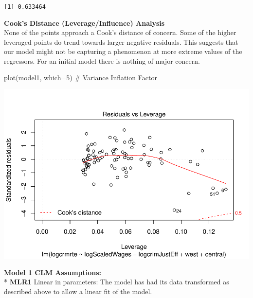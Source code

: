 \documentclass[]{article}
\newenvironment{Shaded}{}{}
\newcommand{\CommentTok}[1]{\textcolor[rgb]{0.00,0.50,0.00}{#1}}
\newcommand{\DataTypeTok}[1]{#1}
\newcommand{\DecValTok}[1]{#1}
\newcommand{\KeywordTok}[1]{\textcolor[rgb]{0.00,0.00,1.00}{#1}}
\newcommand{\NormalTok}[1]{#1}
\newcommand{\OperatorTok}[1]{#1}
\begin{document}
\begin{Shaded}
\end{Shaded}

\begin{verbatim}
[1] 0.633464
\end{verbatim}

\textbf{Cook's Distance (Leverage/Influence) Analysis}\\
None of the points approach a Cook's distance of concern. Some of the
higher leveraged points do trend towards larger negative residuals. This
suggests that our model might not be capturing a phenomenon at more
extreme values of the regressors. For an initial model there is nothing
of major concern.

\begin{Shaded}
\begin{Highlighting}[]
\KeywordTok{plot}\NormalTok{(model1, }\DataTypeTok{which=}\DecValTok{5}\NormalTok{) }\CommentTok{# Variance Inflation Factor}
\end{Highlighting}
\end{Shaded}

\includegraphics{Bagnard_Gaustad_Hartman_Leung_Lab_3_files/figure-latex/unnamed-chunk-59-1.pdf}

\textbf{Model 1 CLM Assumptions:}\\
* \textbf{MLR1} Linear in parameters: The model has had its data
transformed as described above to allow a linear fit of the model.
\end{document}
